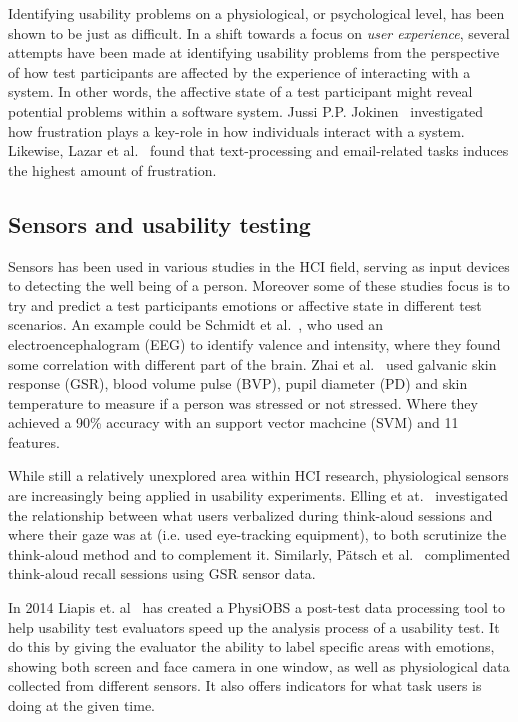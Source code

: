 Identifying usability problems on a physiological, or psychological level, has been shown to be just as difficult. In a
shift towards a focus on \textit{user experience}, several attempts have been made at identifying usability problems
from the perspective of how test participants are affected by the experience of interacting with a system. In other
words, the affective state of a test participant might reveal potential problems within a software system. Jussi
P.P. Jokinen~\cite{workplace_up_study} investigated how frustration plays a key-role in how individuals interact with a
system. Likewise, Lazar et al.~\cite{frustration_with_computers} found that text-processing and email-related tasks
induces the highest amount of frustration.

\subsection{Sensors and usability testing}
Sensors has been used in various studies in the HCI field, serving as input devices to detecting the well being of a person.
Moreover some of these studies focus is to try and predict a test participants emotions or affective state in different test scenarios. 
An example could be Schmidt et al.~\cite{schmidt_trainor}, who used an electroencephalogram (EEG) to identify valence and intensity, where they found some correlation with different part of the brain.
Zhai et al.~\cite{gsr_data_processing2} used galvanic skin response (GSR), blood volume pulse (BVP), pupil diameter (PD) and skin temperature to measure if a person was stressed or not stressed. Where they achieved a 90\% accuracy with an support vector machcine (SVM) and 11 features.

While still a relatively unexplored area within HCI research,
physiological sensors are increasingly being applied in usability experiments.
Elling et at.~\cite{concurrent_think_aloud_eye_tracking} investigated the
relationship between what users verbalized during think-aloud sessions and where
their gaze was at (i.e. used eye-tracking equipment), to both scrutinize the
think-aloud method and to complement it. Similarly, P\"{a}tsch et
al.~\cite{using_sensor_graphs_think_aloud} complimented think-aloud recall
sessions using GSR sensor data.

In 2014 Liapis et. al~\cite{fusion4} has created a PhysiOBS a post-test data processing tool to help usability test evaluators speed up the analysis process of a usability test. It do this by giving the evaluator the ability to label specific areas with emotions, showing both screen and face camera in one window, as well as physiological data collected from different sensors. It also offers indicators for what task users is doing at the given time.

